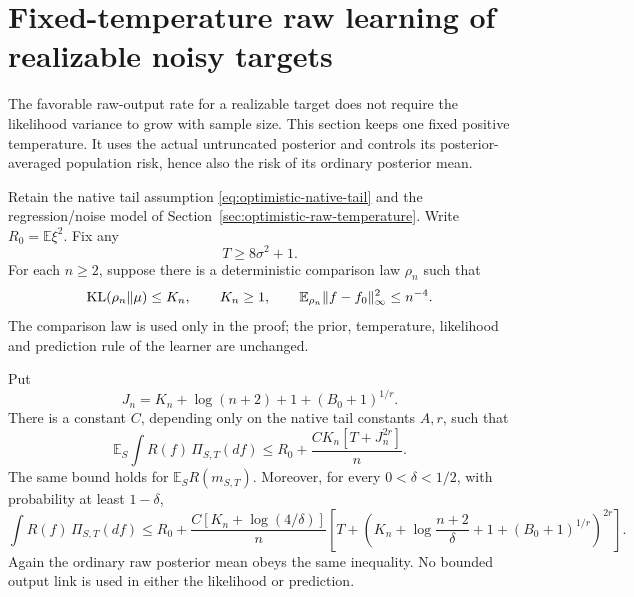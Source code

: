 \section{Fixed-temperature raw learning of realizable noisy targets}
\label{sec:fixed-temperature-realizable}
The favorable raw-output rate for a realizable target does not require the likelihood variance to grow with sample size. This section keeps one fixed positive temperature. It uses the actual untruncated posterior and controls its posterior-averaged population risk, hence also the risk of its ordinary posterior mean.

Retain the native tail assumption \eqref{eq:optimistic-native-tail} and the regression/noise model of Section~\ref{sec:optimistic-raw-temperature}. Write $R_0=\mathbb E\xi^2$. Fix any
\[
 T\ge8\sigma^2+1.
\]
For each $n\ge2$, suppose there is a deterministic comparison law $\rho_n$ such that
\[
 \operatorname{KL}(\rho_n\|\mu)\le K_n,\qquad K_n\ge1,
 \qquad
 \mathbb E_{\rho_n}\|f-f_0\|_\infty^2\le n^{-4}.
\]
The comparison law is used only in the proof; the prior, temperature, likelihood and prediction rule of the learner are unchanged.

\begin{theorem}
\label{thm:fixed-temperature-realizable}
Put
\[
 J_n=K_n+\log(n+2)+1+(B_0+1)^{1/r}.
\]
There is a constant $C$, depending only on the native tail constants $A,r$, such that
\begin{equation}
 \mathbb E_S\int R(f)\,\Pi_{S,T}(df)
 \le R_0+\frac{C K_n[T+J_n^{2r}]}n.
 \label{eq:fixed-temperature-realizable-expectation}
\end{equation}
The same bound holds for $\mathbb E_SR(m_{S,T})$. Moreover, for every $0<\delta<1/2$, with probability at least $1-\delta$,
\begin{equation}
 \int R(f)\,\Pi_{S,T}(df)
 \le R_0+\frac{C[K_n+\log(4/\delta)]}{n}
       \left[T+\left(K_n+\log\frac{n+2}{\delta}
                         +1+(B_0+1)^{1/r}\right)^{2r}\right].
 \label{eq:fixed-temperature-realizable-probability}
\end{equation}
Again the ordinary raw posterior mean obeys the same inequality. No bounded output link is used in either the likelihood or prediction.
\end{theorem}

